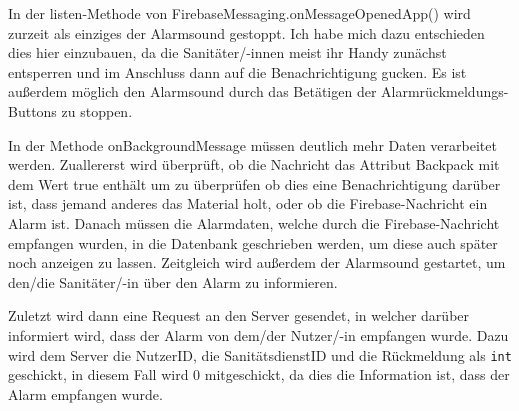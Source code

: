 In der listen-Methode von FirebaseMessaging.onMessageOpenedApp() wird zurzeit als 
einziges der Alarmsound gestoppt. Ich habe mich dazu entschieden dies hier einzubauen, 
da die Sanitäter/-innen meist ihr Handy zunächst entsperren und im Anschluss dann auf 
die Benachrichtigung gucken. Es ist außerdem möglich den Alarmsound durch das Betätigen der
Alarmrückmeldungs-Buttons zu stoppen.

In der Methode onBackgroundMessage müssen deutlich mehr Daten verarbeitet werden. 
Zuallererst wird überprüft, ob die Nachricht das Attribut \glqq Backpack\grqq{} mit 
dem Wert \glqq true\grqq{} enthält um zu überprüfen ob dies eine Benachrichtigung darüber 
ist, dass jemand anderes das Material holt, oder ob die Firebase-Nachricht ein Alarm ist. 
Danach müssen die Alarmdaten, welche durch die Firebase-Nachricht empfangen wurden, in die 
Datenbank geschrieben werden, um diese auch später noch anzeigen zu lassen.
Zeitgleich wird außerdem der Alarmsound gestartet, um den/die Sanitäter/-in über den 
Alarm zu informieren.

Zuletzt wird dann eine Request an den Server gesendet, in welcher darüber informiert 
wird, dass der Alarm von dem/der Nutzer/-in empfangen wurde. Dazu wird dem Server die NutzerID,
die SanitätsdienstID und die Rückmeldung als \texttt{int} geschickt, in diesem Fall wird 0 
mitgeschickt, da dies die Information ist, dass der Alarm empfangen wurde.